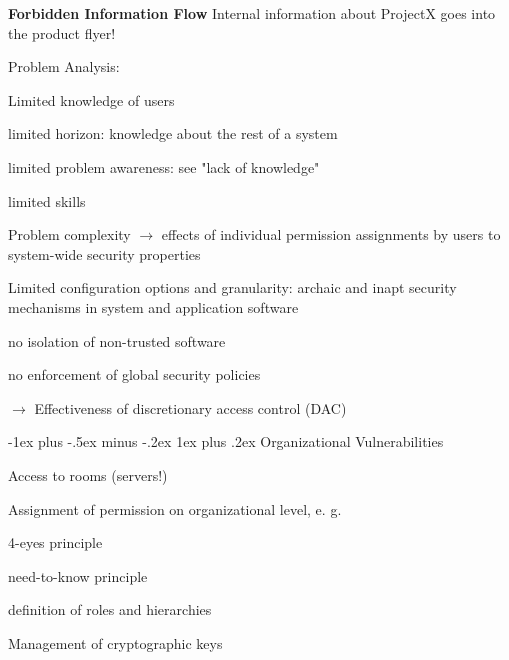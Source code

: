 \documentclass[a4paper]{article}
\makeatletter
\renewcommand{\note}[2]{\begin{noteBox} \textbf{#1} #2 \end{noteBox}}
\renewcommand{\subsubsection}{\@startsection{subsubsection}{3}{0mm}%
                                {-1ex plus -.5ex minus -.2ex}%
                                {1ex plus .2ex}%
                                {\normalfont\small\bfseries}}
\makeatother
\begin{document}
\begin{multicols}{3}
    \note{Forbidden Information Flow}{Internal information about ProjectX goes into the product flyer!}

    Problem Analysis:
    \begin{itemize*}
        \item Limited knowledge of users
        \begin{itemize*}
            \item limited horizon: knowledge about the rest of a system
            \item limited problem awareness: see "lack of knowledge"
            \item limited skills
        \end{itemize*}
        \item Problem complexity $\rightarrow$  effects of individual permission assignments by users to system-wide security properties
        \item Limited configuration options and granularity: archaic and inapt security mechanisms in system and application software
        \begin{itemize*}
            \item no isolation of non-trusted software
            \item no enforcement of global security policies
        \end{itemize*}
        \item $\rightarrow$ Effectiveness of discretionary access control (DAC)
    \end{itemize*}

    \subsubsection{Organizational Vulnerabilities}
    \begin{itemize*}
        \item Access to rooms (servers!)
        \item Assignment of permission on organizational level, e. g.
        \begin{itemize*}
            \item 4-eyes principle
            \item need-to-know principle
            \item definition of roles and hierarchies
        \end{itemize*}
        \item Management of cryptographic keys
    \end{itemize*}


\end{multicols}
\end{document}
